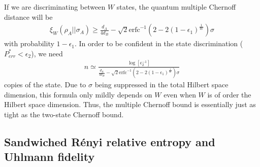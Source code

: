 \documentclass[a4paper,11pt]{article}
\begin{document}
If we are discriminating between $W$ states, the quantum multiple Chernoff distance will be
\begin{align}
    \xi_W(\rho_A || \sigma_A) \geq \frac{d_A}{4d_B} - {\sqrt{2} \text{erfc}^{-1}\left(2-2 (1-\epsilon_1 )^{\frac{1}{W}}\right)}\sigma
    \label{multiple_chernoff_distance}
\end{align}
with probability $1-\epsilon_1$. In order to be confident in the state discrimination ($P^*_{err} < \epsilon_2$), we need 
\begin{align}
    n \simeq  \frac{\log\left[ \epsilon_2^{-1}\right]}{\frac{d_A}{4d_B} - {\sqrt{2} \text{erfc}^{-1}\left(2-2 (1-\epsilon_1 )^{\frac{1}{W}}\right)}\sigma} 
\end{align}
copies of the state. Due to $\sigma$ being suppressed in the total Hilbert space dimension, this formula only mildly depends on $W$ even when $W$ is of order the Hilbert space dimension. Thus, the multiple Chernoff bound is essentially just as tight as the two-state Chernoff bound.

\subsection{Sandwiched R\'enyi relative entropy and Uhlmann fidelity}
\end{document}
